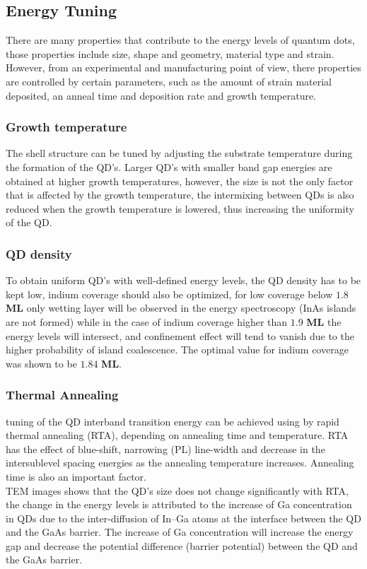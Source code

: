 \documentclass[twoside,11pt]{article}
\begin{document}
        

    \subsection{Energy Tuning}
    There are many properties that contribute to the energy levels of quantum dots, those properties include size, shape and geometry, material type and strain. However, from an experimental and manufacturing point of view, there properties are controlled by certain parameters, such as the amount of strain material deposited, an anneal time and deposition rate and growth temperature.

        \subsubsection{Growth temperature}
         The shell structure can be tuned by adjusting the substrate temperature during the formation of the QD’s. Larger QD’s with smaller band gap energies are obtained at higher growth temperatures, however, the size is not the only factor that is affected by the growth temperature, the intermixing between QDs is also reduced when the growth temperature is lowered, thus increasing the uniformity of the QD. \cite{fafard1999manipulating}

        \subsubsection{QD density}
        To obtain uniform QD’s with well-defined energy levels, the QD density has to be kept low, indium coverage should also be optimized, for low coverage below $1.8$ \textbf{ML} only wetting layer will be observed in the energy spectroscopy (InAs islands are not formed) while in the case of indium coverage higher than $1.9$ \textbf{ML} the energy levels will intersect, and confinement effect will tend to vanish due to the higher probability of island coalescence. The optimal value for indium coverage was shown to be $1.84$ \textbf{ML}.\cite{fafard1999manipulating}
        
        \subsubsection{Thermal Annealing}
         tuning of the QD interband transition energy can be achieved using by rapid thermal annealing (RTA), depending on annealing time and temperature. RTA has the effect of blue-shift, narrowing (PL) line-width and decrease in the intersublevel spacing energies as the annealing temperature increases. Annealing time is also an important factor.\\TEM images shows that the QD's size does not change significantly with RTA, the change in the energy levels is attributed to the increase of Ga concentration in QDs due to the inter-diffusion of In–Ga atoms at the interface between the QD and the GaAs barrier. The increase of Ga concentration will increase the energy gap and decrease the potential difference (barrier potential) between the QD and the GaAs barrier.\cite{hsu2000tuning}
\end{document}
